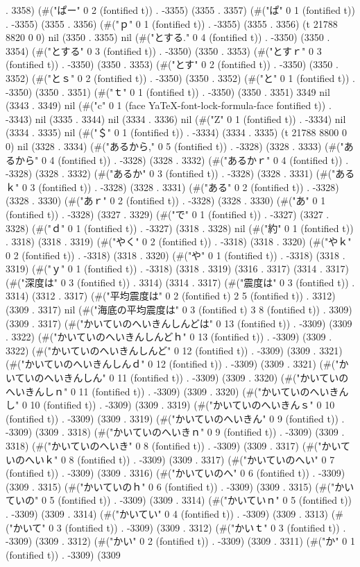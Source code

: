. 3358) (#("ぱー" 0 2 (fontified t)) . -3355) (3355 . 3357) (#("ぱ" 0 1 (fontified t)) . -3355) (3355 . 3356) (#("ｐ" 0 1 (fontified t)) . -3355) (3355 . 3356) (t 21788 8820 0 0) nil (3350 . 3355) nil (#("とする." 0 4 (fontified t)) . -3350) (3350 . 3354) (#("とする" 0 3 (fontified t)) . -3350) (3350 . 3353) (#("とすｒ" 0 3 (fontified t)) . -3350) (3350 . 3353) (#("とす" 0 2 (fontified t)) . -3350) (3350 . 3352) (#("とｓ" 0 2 (fontified t)) . -3350) (3350 . 3352) (#("と" 0 1 (fontified t)) . -3350) (3350 . 3351) (#("ｔ" 0 1 (fontified t)) . -3350) (3350 . 3351) 3349 nil (3343 . 3349) nil (#("c" 0 1 (face YaTeX-font-lock-formula-face fontified t)) . -3343) nil (3335 . 3344) nil (3334 . 3336) nil (#("Z" 0 1 (fontified t)) . -3334) nil (3334 . 3335) nil (#("＄" 0 1 (fontified t)) . -3334) (3334 . 3335) (t 21788 8800 0 0) nil (3328 . 3334) (#("あるから," 0 5 (fontified t)) . -3328) (3328 . 3333) (#("あるから" 0 4 (fontified t)) . -3328) (3328 . 3332) (#("あるかｒ" 0 4 (fontified t)) . -3328) (3328 . 3332) (#("あるか" 0 3 (fontified t)) . -3328) (3328 . 3331) (#("あるｋ" 0 3 (fontified t)) . -3328) (3328 . 3331) (#("ある" 0 2 (fontified t)) . -3328) (3328 . 3330) (#("あｒ" 0 2 (fontified t)) . -3328) (3328 . 3330) (#("あ" 0 1 (fontified t)) . -3328) (3327 . 3329) (#("で" 0 1 (fontified t)) . -3327) (3327 . 3328) (#("ｄ" 0 1 (fontified t)) . -3327) (3318 . 3328) nil (#("約" 0 1 (fontified t)) . 3318) (3318 . 3319) (#("やく" 0 2 (fontified t)) . -3318) (3318 . 3320) (#("やｋ" 0 2 (fontified t)) . -3318) (3318 . 3320) (#("や" 0 1 (fontified t)) . -3318) (3318 . 3319) (#("ｙ" 0 1 (fontified t)) . -3318) (3318 . 3319) (3316 . 3317) (3314 . 3317) (#("深度は" 0 3 (fontified t)) . 3314) (3314 . 3317) (#("震度は" 0 3 (fontified t)) . 3314) (3312 . 3317) (#("平均震度は" 0 2 (fontified t) 2 5 (fontified t)) . 3312) (3309 . 3317) nil (#("海底の平均震度は" 0 3 (fontified t) 3 8 (fontified t)) . 3309) (3309 . 3317) (#("かいていのへいきんしんどは" 0 13 (fontified t)) . -3309) (3309 . 3322) (#("かいていのへいきんしんどｈ" 0 13 (fontified t)) . -3309) (3309 . 3322) (#("かいていのへいきんしんど" 0 12 (fontified t)) . -3309) (3309 . 3321) (#("かいていのへいきんしんｄ" 0 12 (fontified t)) . -3309) (3309 . 3321) (#("かいていのへいきんしん" 0 11 (fontified t)) . -3309) (3309 . 3320) (#("かいていのへいきんしｎ" 0 11 (fontified t)) . -3309) (3309 . 3320) (#("かいていのへいきんし" 0 10 (fontified t)) . -3309) (3309 . 3319) (#("かいていのへいきんｓ" 0 10 (fontified t)) . -3309) (3309 . 3319) (#("かいていのへいきん" 0 9 (fontified t)) . -3309) (3309 . 3318) (#("かいていのへいきｎ" 0 9 (fontified t)) . -3309) (3309 . 3318) (#("かいていのへいき" 0 8 (fontified t)) . -3309) (3309 . 3317) (#("かいていのへいｋ" 0 8 (fontified t)) . -3309) (3309 . 3317) (#("かいていのへい" 0 7 (fontified t)) . -3309) (3309 . 3316) (#("かいていのへ" 0 6 (fontified t)) . -3309) (3309 . 3315) (#("かいていのｈ" 0 6 (fontified t)) . -3309) (3309 . 3315) (#("かいていの" 0 5 (fontified t)) . -3309) (3309 . 3314) (#("かいていｎ" 0 5 (fontified t)) . -3309) (3309 . 3314) (#("かいてい" 0 4 (fontified t)) . -3309) (3309 . 3313) (#("かいて" 0 3 (fontified t)) . -3309) (3309 . 3312) (#("かいｔ" 0 3 (fontified t)) . -3309) (3309 . 3312) (#("かい" 0 2 (fontified t)) . -3309) (3309 . 3311) (#("か" 0 1 (fontified t)) . -3309) (3309 